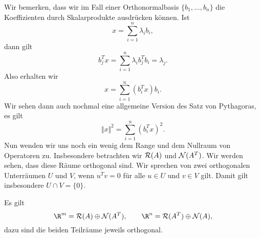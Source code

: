 \documentclass[letterpaper,10pt,english]{jupyterBook}
\begin{document}
Wir bemerken, dass wir im Fall einer Orthonormalbasis \(\{b_1,\ldots,b_n\}\) die Koeffizienten durch Skalarprodukte ausdrücken können. Ist
\begin{equation*}
 x = \sum_{i=1}^n \lambda_i b_i,
\end{equation*}
dann gilt
\begin{equation*}
 b_j^T x = \sum_{i=1}^n \lambda_i b_j^T b_i = \lambda_j.
\end{equation*}
Also erhalten wir
\begin{equation*}
 x= \sum_{i=1}^n (b_i^T x) b_i.
\end{equation*}
Wir sehen dann auch nochmal eine allgemeine Version des Satz von Pythagoras, es gilt
\begin{equation*}
 \Vert x \Vert^2 = \sum_{i=1}^n (b_i^T x)^2.
\end{equation*}
Nun wenden wir uns noch ein wenig dem Range und dem Nullraum von Operatoren zu. Insbesondere betrachten wir \({\cal R}(A)\) und \({\cal N}(A^T)\). Wir werden sehen, dass diese Räume orthogonal sind. Wir sprechen von zwei orthogonalen Unterräumen \(U\) und \(V\), wenn \(u^T v = 0\) für alle \(u \in U\) und \(v \in V\) gilt. Damit gilt insbesondere \(U \cap V = \{0\}\).
\label{vektorraeume/LGS:theorem-5}
\begin{theorem}{}{}



Es gilt
\begin{equation*}
 \R^m  = {\cal R}(A) \oplus {\cal N}(A^T), \qquad \R^n = {\cal R}(A^T) \oplus {\cal N}(A ),
\end{equation*}
dazu sind die beiden Teilräume jeweils orthogonal.
\end{theorem}
\end{document}
